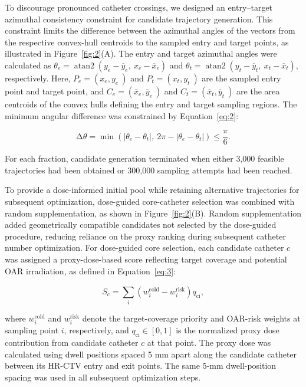 \documentclass[12pt,twoside,letterpaper]{article}
\begin{document}
To discourage pronounced catheter crossings, we designed an entry--target azimuthal consistency constraint for candidate trajectory generation. This constraint limits the difference between the azimuthal angles of the vectors from the respective convex-hull centroids to the sampled entry and target points, as illustrated in Figure~\ref{fig:2}(A). The entry and target azimuthal angles were calculated as $\theta_{e} = \operatorname{atan2}\left( y_{e} - {\overline{y}}_{e},\ x_{e} - {\overline{x}}_{e} \right)$ and $\theta_{t} = \operatorname{atan2}\left( y_{t} - {\overline{y}}_{t},\ x_{t} - {\overline{x}}_{t} \right)$, respectively. Here, $P_{e} = \left( x_{e},y_{e}\  \right)$ and $P_{t} = \left( x_{t},y_{t}\  \right)$ are the sampled entry point and target point, and $C_{e} = \left( {\overline{x}}_{e},{\overline{y}}_{e}\  \right)$ and $C_{t} = \left( {\overline{x}}_{t},{\overline{y}}_{t}\  \right)$ are the area centroids of the convex hulls defining the entry and target sampling regions. The minimum angular difference was constrained by Equation~\eqref{eq:2}:

\begin{equation}\label{eq:2}
\mathrm{\Delta}\theta = \min\left( \left| \theta_{e} - \theta_{t} \right|,\ 2\pi - \left| \theta_{e} - \theta_{t} \right| \right) \leq \frac{\pi}{6}.
\end{equation}

For each fraction, candidate generation terminated when either 3,000 feasible trajectories had been obtained or 300,000 sampling attempts had been reached.

To provide a dose-informed initial pool while retaining alternative trajectories for subsequent optimization, dose-guided core-catheter selection was combined with random supplementation, as shown in Figure~\ref{fig:2}(B). Random supplementation added geometrically compatible candidates not selected by the dose-guided procedure, reducing reliance on the proxy ranking during subsequent catheter number optimization. For dose-guided core selection, each candidate catheter $c$ was assigned a proxy-dose-based score reflecting target coverage and potential OAR irradiation, as defined in Equation~\eqref{eq:3}:

\begin{equation}\label{eq:3}
S_{c} = \sum_{i}^{}(w_{i}^{\text{cold}} - w_{i}^{\text{risk}})q_{\text{ci}},
\end{equation}

where $w_{i}^{\text{cold}}$ and $w_{i}^{\text{risk}}$ denote the target-coverage priority and OAR-risk weights at sampling point $i$, respectively, and $q_{\text{ci}} \in \left\lbrack 0,1 \right\rbrack$ is the normalized proxy dose contribution from candidate catheter $c$ at that point. The proxy dose was calculated using dwell positions spaced 5 mm apart along the candidate catheter between its HR-CTV entry and exit points. The same 5-mm dwell-position spacing was used in all subsequent optimization steps.
\end{document}
